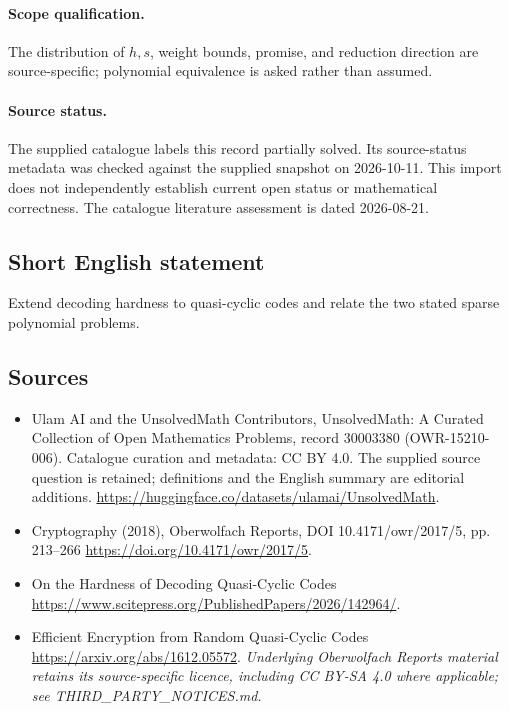 \documentclass[11pt]{article}
\begin{document}
\paragraph{Scope qualification.}
The distribution of $h,s$, weight bounds, promise, and reduction direction are source-specific; polynomial equivalence is asked rather than assumed.
\paragraph{Source status.}
The supplied catalogue labels this record partially solved. Its source-status metadata was checked against the supplied snapshot on 2026-10-11. This import does not independently establish current open status or mathematical correctness. The catalogue literature assessment is dated 2026-08-21.
\subsection{Short English statement}
Extend decoding hardness to quasi-cyclic codes and relate the two stated sparse polynomial problems.
\subsection{Sources}
\begin{itemize}
\item[S1] Ulam AI and the UnsolvedMath Contributors, UnsolvedMath: A Curated Collection of Open Mathematics Problems, record 30003380 (OWR-15210-006). Catalogue curation and metadata: CC BY 4.0. The supplied source question is retained; definitions and the English summary are editorial additions.
\url{https://huggingface.co/datasets/ulamai/UnsolvedMath}.
\item[S2] Cryptography (2018), Oberwolfach Reports, DOI 10.4171/owr/2017/5, pp. 213--266
\url{https://doi.org/10.4171/owr/2017/5}.
\item[S3] On the Hardness of Decoding Quasi-Cyclic Codes
\url{https://www.scitepress.org/PublishedPapers/2026/142964/}.
\item[S4] Efficient Encryption from Random Quasi-Cyclic Codes
\url{https://arxiv.org/abs/1612.05572}.
\textit{Underlying Oberwolfach Reports material retains its source-specific licence, including CC BY-SA 4.0 where applicable; see THIRD\_PARTY\_NOTICES.md.}
\end{itemize}
\end{document}
